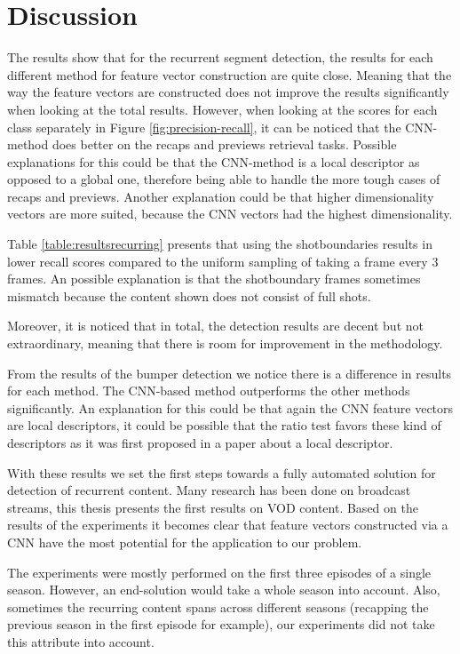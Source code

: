 \documentclass{article}
\begin{document}
\section{Discussion} \label{discussion}
The results show that for the recurrent segment detection, the results for each different method for feature vector construction are quite close. Meaning that the way the feature vectors are constructed does not improve the results significantly when looking at the total results. However, when looking at the scores for each class separately in Figure \ref{fig:precision-recall}, it can be noticed that the CNN-method does better on the recaps and previews retrieval tasks. Possible explanations for this could be that the CNN-method is a local descriptor as opposed to a global one, therefore being able to handle the more tough cases of recaps and previews. Another explanation could be that higher dimensionality vectors are more suited, because the CNN vectors had the highest dimensionality.

Table \ref{table:resultsrecurring} presents that using the shotboundaries results in lower recall scores compared to the uniform sampling of taking a frame every 3 frames. An possible explanation is that the shotboundary frames sometimes mismatch because the content shown does not consist of full shots.


Moreover, it is noticed that in total, the detection results are decent but not extraordinary, meaning that there is room for improvement in the methodology. 

From the results of the bumper detection we notice there is a difference in results for each method. The CNN-based method outperforms the other methods significantly. An explanation for this could be that again the CNN feature vectors are local descriptors, it could be possible that the ratio test favors these kind of descriptors as it was first proposed in a paper about a local descriptor.

With these results we set the first steps towards a fully automated solution for detection of recurrent content. Many research has been done on broadcast streams, this thesis presents the first results on VOD content. Based on the results of the experiments it becomes clear that feature vectors constructed via a CNN have the most potential for the application to our problem.

The experiments were mostly performed on the first three episodes of a single season. However, an end-solution would take a whole season into account. Also, sometimes the recurring content spans across different seasons (recapping the previous season in the first episode for example), our experiments did not take this attribute into account.
\end{document}
